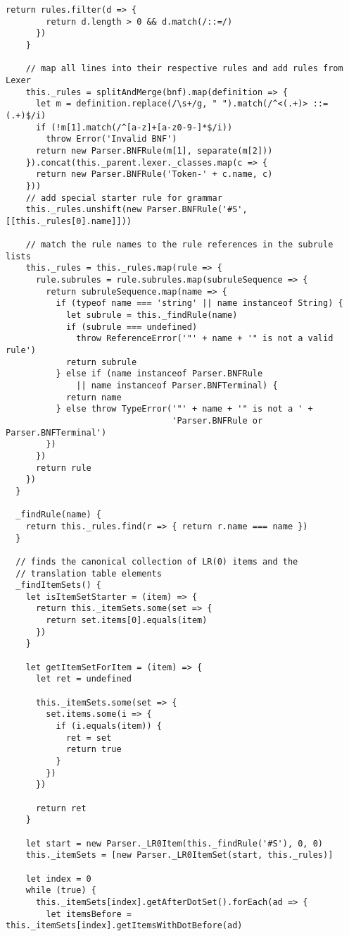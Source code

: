 \begin{lstlisting}[frame=single]
      return rules.filter(d => { 
        return d.length > 0 && d.match(/::=/) 
      })
    }
    
    // map all lines into their respective rules and add rules from Lexer
    this._rules = splitAndMerge(bnf).map(definition => {
      let m = definition.replace(/\s+/g, " ").match(/^<(.+)> ::= (.+)$/i)
      if (!m[1].match(/^[a-z]+[a-z0-9-]*$/i))
        throw Error('Invalid BNF')
      return new Parser.BNFRule(m[1], separate(m[2]))
    }).concat(this._parent.lexer._classes.map(c => {
      return new Parser.BNFRule('Token-' + c.name, c)
    }))
    // add special starter rule for grammar
    this._rules.unshift(new Parser.BNFRule('#S', [[this._rules[0].name]]))
    
    // match the rule names to the rule references in the subrule lists
    this._rules = this._rules.map(rule => {
      rule.subrules = rule.subrules.map(subruleSequence => {
        return subruleSequence.map(name => {
          if (typeof name === 'string' || name instanceof String) {
            let subrule = this._findRule(name)
            if (subrule === undefined) 
              throw ReferenceError('"' + name + '" is not a valid rule')
            return subrule
          } else if (name instanceof Parser.BNFRule 
              || name instanceof Parser.BNFTerminal) {
            return name
          } else throw TypeError('"' + name + '" is not a ' + 
                                 'Parser.BNFRule or Parser.BNFTerminal')
        })
      })
      return rule
    })
  }
  
  _findRule(name) {
    return this._rules.find(r => { return r.name === name })
  }
  
  // finds the canonical collection of LR(0) items and the 
  // translation table elements
  _findItemSets() {
    let isItemSetStarter = (item) => {
      return this._itemSets.some(set => {
        return set.items[0].equals(item)
      })
    }
    
    let getItemSetForItem = (item) => {
      let ret = undefined
      
      this._itemSets.some(set => {
        set.items.some(i => {
          if (i.equals(item)) {
            ret = set
            return true
          }
        })
      })
      
      return ret
    }
    
    let start = new Parser._LR0Item(this._findRule('#S'), 0, 0)
    this._itemSets = [new Parser._LR0ItemSet(start, this._rules)]
    
    let index = 0
    while (true) {
      this._itemSets[index].getAfterDotSet().forEach(ad => {
        let itemsBefore = this._itemSets[index].getItemsWithDotBefore(ad)
        

\end{lstlisting}
